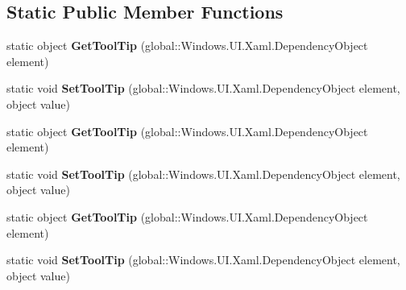 \subsection*{Static Public Member Functions}
\begin{DoxyCompactItemize}
\item 
\mbox{\label{class_windows_1_1_u_i_1_1_xaml_1_1_controls_1_1_tool_tip_service_a9fa61fd3c9c52ae20e7cdd1644808cda}} 
static object {\bfseries Get\+Tool\+Tip} (global\+::\+Windows.\+U\+I.\+Xaml.\+Dependency\+Object element)
\item 
\mbox{\label{class_windows_1_1_u_i_1_1_xaml_1_1_controls_1_1_tool_tip_service_aae99b83ec3154c4c13b20b265449b018}} 
static void {\bfseries Set\+Tool\+Tip} (global\+::\+Windows.\+U\+I.\+Xaml.\+Dependency\+Object element, object value)
\item 
\mbox{\label{class_windows_1_1_u_i_1_1_xaml_1_1_controls_1_1_tool_tip_service_a9fa61fd3c9c52ae20e7cdd1644808cda}} 
static object {\bfseries Get\+Tool\+Tip} (global\+::\+Windows.\+U\+I.\+Xaml.\+Dependency\+Object element)
\item 
\mbox{\label{class_windows_1_1_u_i_1_1_xaml_1_1_controls_1_1_tool_tip_service_aae99b83ec3154c4c13b20b265449b018}} 
static void {\bfseries Set\+Tool\+Tip} (global\+::\+Windows.\+U\+I.\+Xaml.\+Dependency\+Object element, object value)
\item 
\mbox{\label{class_windows_1_1_u_i_1_1_xaml_1_1_controls_1_1_tool_tip_service_a9fa61fd3c9c52ae20e7cdd1644808cda}} 
static object {\bfseries Get\+Tool\+Tip} (global\+::\+Windows.\+U\+I.\+Xaml.\+Dependency\+Object element)
\item 
\mbox{\label{class_windows_1_1_u_i_1_1_xaml_1_1_controls_1_1_tool_tip_service_aae99b83ec3154c4c13b20b265449b018}} 
static void {\bfseries Set\+Tool\+Tip} (global\+::\+Windows.\+U\+I.\+Xaml.\+Dependency\+Object element, object value)
\item 

\end{DoxyCompactItemize}
